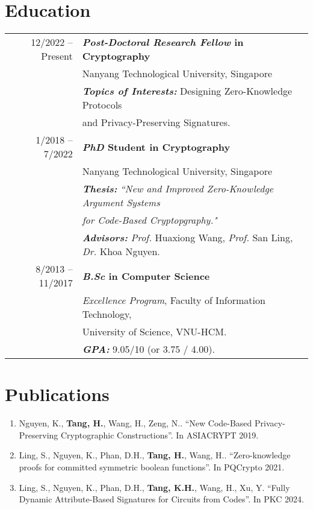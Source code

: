 \documentclass[a4paper, 11pt]{article}
\begin{document}
	\section{Education}
	\begin{tabular}{rl}	
		12/2022 -- Present & \textbf{\textit{Post-Doctoral Research Fellow} in Cryptography} \\
		& Nanyang Technological University, Singapore   \\
		\ & \textbf{\textit{Topics of Interests:}} Designing Zero-Knowledge Protocols\\ &and Privacy-Preserving Signatures.\\
		1/2018 -- 7/2022 & \textbf{\textit{PhD} Student in Cryptography} \\
		& Nanyang Technological University, Singapore   \\
		\ & \textbf{\textit{Thesis:}} \textit{``New and Improved Zero-Knowledge Argument Systems}\\&\textit{           for Code-Based Cryptopgraphy."}\\
		
		\ & \textbf{\textit{Advisors:}} \textit{Prof.}\! Huaxiong Wang, \textit{Prof.}\! San Ling, \textit{Dr.}\! Khoa Nguyen.\\
		8/2013 -- 11/2017 & \textbf{\textit{B.Sc} in Computer Science} \\ 
		& \textit{Excellence Program}, Faculty of Information Technology,\\ &University of Science, VNU-HCM.\\
		\ & \textbf{\textit{GPA:}} 9.05/10 (or 3.75 / 4.00).
	\end{tabular}
	
	\section{Publications}
	\begin{enumerate}
		\item Nguyen, K., \textbf{Tang, H.}, Wang, H., Zeng, N.. ``New Code-Based Privacy-Preserving Cryptographic Constructions''. In ASIACRYPT 2019.
	
		\item Ling, S., Nguyen, K., Phan, D.H., \textbf{Tang, H.}, Wang, H.. ``Zero-knowledge
	proofs for committed symmetric boolean functions''. In PQCrypto 2021.
	
		\item Ling, S., Nguyen, K., Phan, D.H., \textbf{Tang, K.H.}, Wang, H., Xu, Y. ``Fully Dynamic Attribute-Based Signatures for Circuits from Codes''. In PKC 2024.
	\end{enumerate}
	
\end{document}
